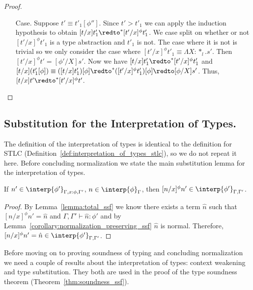 \begin{proof}
\begin{itemize}
\item[Case.] Suppose $t' \equiv t'_1[\phi'']$.
  Since $t' > t'_1$ we can apply the induction hypothesis to
  obtain $[t/x] t'_1 \redto^* [t'/x]^\phi t'_1$.  We case split on whether or not $[t'/x]^\phi t'_1$ is
  a type abstraction and $t'_1$ is not.  The case where it is not is trivial so we only consider
  the case where $[t'/x]^\phi t'_1 \equiv \Lambda X:*_l.s'$.  Then 
  $[t'/x]^\phi t'  = [\phi'/X]s'$.  Now we have $[t/x] t'_1 \redto^* [t'/x]^\phi t'_1$ and
  $[t/x](t'_1[\phi]) \equiv ([t/x]t'_1)[\phi] \redto^* ([t'/x]^\phi t'_1)[\phi] \redto [\phi/X]s'$.  Thus,
  $[t/x]t' \redto^* [t'/x]^\phi t'$.  
\end{itemize}
\end{proof}

\subsection{Substitution for the Interpretation of Types.}
\label{subsec:substitution_for_the_interpretation_of_types_ssf}
The definition of the interpretation of types is identical to the
definition for STLC (Definition~\ref{def:interpretation_of_types_stlc}),
so we do not repeat it here.  Before concluding normalization we state
the main substitution lemma for the interpretation of types.
\begin{lemma}
  If $n' \in \interp{\phi'}_{\Gamma,x:\phi,\Gamma'}$, $n \in \interp{\phi}_\Gamma$, then 
  $[n/x]^\phi n' \in \interp{\phi'}_{\Gamma,\Gamma'}$.
  
  \label{lemma:interpretation_of_types_closed_substitution_ssf}
\end{lemma}
\begin{proof}
  By Lemma~\ref{lemma:total_ssf} we know there exists a term $\hat{n}$ 
  such that $[n/x]^\phi n' = \hat{n}$ and $\Gamma,\Gamma' \vdash \hat{n}:\phi'$ and by 
  Lemma~\ref{corollary:normalization_preserving_ssf} $\hat{n}$ is normal.  Therefore,
  $[n/x]^\phi n' = \hat{n} \in \interp{\phi'}_{\Gamma,\Gamma'}$.
\end{proof}

Before moving on to proving soundness of typing and concluding
normalization we need a couple of results about the interpretation of
types: context weakening and type substitution.  They both are used in
the proof of the type soundness theorem
(Theorem~\ref{thm:soundness_ssf}).

